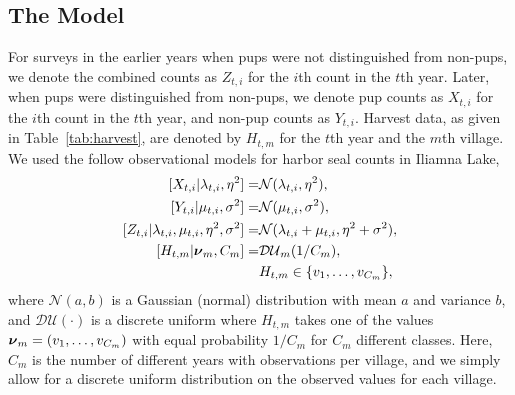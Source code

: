 \documentclass[]{risa}\usepackage[]{graphicx}\usepackage[]{color}
\def\bnu{\mbox{\boldmath $\nu$}}
\begin{document}
\subsection{The Model} \label{sec:model}
For surveys in the earlier years when pups were not distinguished from non-pups, we denote the combined counts as $Z_{t,i}$ for the $i$th count in the $t$th year.  Later, when pups were distinguished from non-pups, we denote pup counts as $X_{t,i}$ for the $i$th count in the $t$th year, and non-pup counts as $Y_{t,i}$. Harvest data, as given in  Table~\ref{tab:harvest}, are denoted by $H_{t,m}$ for the $t$th year and the $m$th village. We used the follow observational models for harbor seal counts in Iliamna Lake,
\begin{align} \label{eq:modelSetup}
{[}X_{t,i}|\lambda_{t,i},\eta^2]=&\mathcal{N}(\lambda_{t,i}, \eta^2),\nonumber\\ 
{[}Y_{t,i}|\mu_{t,i},\sigma^2]=& \mathcal{N}(\mu_{t,i}, \sigma^2) \nonumber, \\
{[}Z_{t,i}|\lambda_{t,i},\mu_{t,i},\eta^2,\sigma^2] =& \mathcal{N}(\lambda_{t,i} + \mu_{t,i}, \eta^2 + \sigma^2), \nonumber \\
{[}H_{t,m}|\bnu_m,C_m] =& \mathcal{DU}_m(1/C_m), \nonumber \\
 & H_{t,m} \in \{v_1,\ldots,v_{C_m}\}, 
\end{align}
where $\mathcal{N}(a,b)$ is a Gaussian (normal) distribution with mean $a$ and variance $b$, and $\mathcal{DU}(\cdot)$ is a discrete uniform where $H_{t,m}$ takes one of the values $\bnu_m = (v_1,\ldots,v_{C_m})$ with equal probability $1/C_m$ for $C_m$ different classes.  Here, $C_m$ is the number of different years with observations per village, and we simply allow for a discrete uniform distribution on the observed values for each village.
\end{document}
